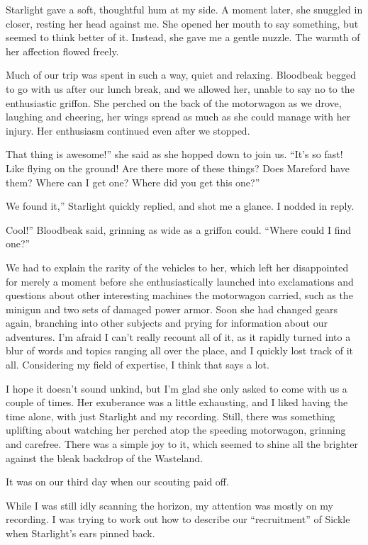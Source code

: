 Starlight gave a soft, thoughtful hum at my side. A moment later, she snuggled in closer, resting her head against me. She opened her mouth to say something, but seemed to think better of it. Instead, she gave me a gentle nuzzle. The warmth of her affection flowed freely.

Much of our trip was spent in such a way, quiet and relaxing. Bloodbeak begged to go with us after our lunch break, and we allowed her, unable to say no to the enthusiastic griffon. She perched on the back of the motorwagon as we drove, laughing and cheering, her wings spread as much as she could manage with her injury. Her enthusiasm continued even after we stopped.

\leavevmode{}That thing is awesome!” she said as she hopped down to join us. “It’s so fast! Like flying on the ground! Are there more of these things? Does Mareford have them? Where can I get one? Where did you get this one?”

\leavevmode{}We found it,” Starlight quickly replied, and shot me a glance. I nodded in reply.

\leavevmode{}Cool!” Bloodbeak said, grinning as wide as a griffon could. “Where could I find one?”

We had to explain the rarity of the vehicles to her, which left her disappointed for merely a moment before she enthusiastically launched into exclamations and questions about other interesting machines the motorwagon carried, such as the minigun and two sets of damaged power armor. Soon she had changed gears again, branching into other subjects and prying for information about our adventures. I’m afraid I can’t really recount all of it, as it rapidly turned into a blur of words and topics ranging all over the place, and I quickly lost track of it all. Considering my field of expertise, I think that says a lot.

I hope it doesn’t sound unkind, but I’m glad she only asked to come with us a couple of times. Her exuberance was a little exhausting, and I liked having the time alone, with just Starlight and my recording. Still, there was something uplifting about watching her perched atop the speeding motorwagon, grinning and carefree. There was a simple joy to it, which seemed to shine all the brighter against the bleak backdrop of the Wasteland.

{\br}%
It was on our third day when our scouting paid off.

While I was still idly scanning the horizon, my attention was mostly on my recording. I was trying to work out how to describe our “recruitment” of Sickle when Starlight’s ears pinned back.

